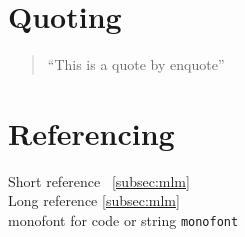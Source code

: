 \documentclass[a4paper, english]{ttlab-qualify}
\begin{document}
    \section{Quoting}
    \begin{quote}
        \enquote{This is a quote by enquote}
    \end{quote}

    \section{Referencing}
    Short reference ~\ref{subsec:mlm}\\
    Long reference \autoref{subsec:mlm}\\
    monofont for code or string \texttt{monofont}

    \appendix
    \printbibliography
\end{document}
